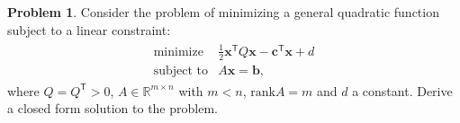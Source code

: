 \documentclass[12pt]{article}
\theoremstyle{definition}
\newtheorem{problem}{Problem}
\newcommand{\vc}[1]{\boldsymbol{#1}}
\newcommand{\tran}{\mathsf{T}}
\begin{document}
\newpage


\begin{problem}
  Consider the problem of minimizing a general quadratic function subject to a linear constraint:
  \begin{align*}
    \begin{array}{rl}
      \text{minimize} & \frac{1}{2} \vc{x}^\tran Q \vc{x} - \vc{c}^\tran \vc{x} + d\\
      \text{subject to} & A\vc{x} = \vc{b},
    \end{array}
  \end{align*}
  where $Q=Q^\tran > 0$, $A \in\mathbb{R}^{m \times n}$ with $m<n$, $\text{rank} A = m$ and $d$ a constant.
  Derive a closed form solution to the problem.
\end{problem}
\end{document}
